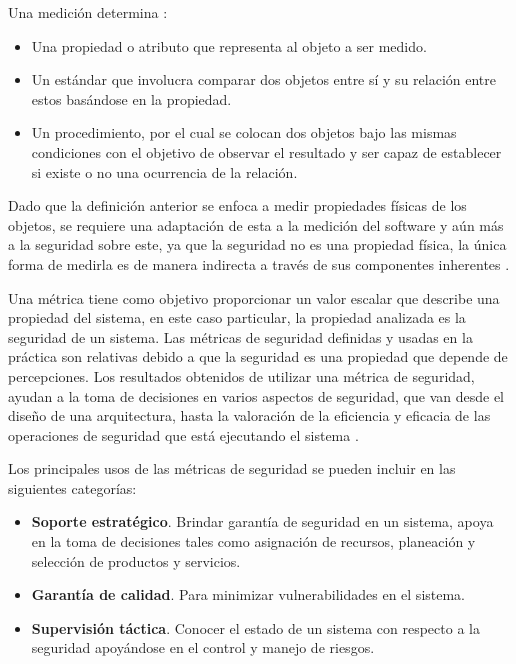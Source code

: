 Una medición determina \cite{ZalDraMcK14}:

\begin{itemize}[noitemsep]
	\item Una propiedad o atributo que representa al objeto a ser medido.
	\item Un estándar que involucra comparar dos objetos entre sí y su relación entre estos basándose en la propiedad.
	\item Un procedimiento, por el cual se colocan dos objetos bajo las mismas condiciones con el objetivo de observar el resultado y ser capaz de establecer si existe o no una ocurrencia de la relación. %
\end{itemize}

Dado que la definición anterior se enfoca a medir propiedades físicas de los objetos, se requiere una adaptación de esta a la medición del software y aún más a la seguridad sobre este, ya que la seguridad no es una propiedad física, la única forma de medirla es de manera indirecta a través de sus componentes inherentes \cite{ZalDraMcK14}.


\vspace{0.3cm}

Una métrica tiene como objetivo proporcionar un valor escalar que describe una propiedad del sistema, en este caso particular, la propiedad analizada es la seguridad de un sistema. Las métricas de seguridad definidas y usadas en la práctica son relativas debido a que la seguridad es una propiedad que depende de percepciones.  Los resultados obtenidos de utilizar una métrica de seguridad, ayudan a la toma de decisiones en varios aspectos de seguridad, que van desde el diseño de una arquitectura, hasta la valoración de la eficiencia y eficacia de las operaciones de seguridad que está ejecutando el sistema \cite{Var1103,Jan0904}. 

\vspace{0.3cm}

Los principales usos de las métricas de seguridad se pueden incluir en las siguientes categorías:

\begin{itemize}[noitemsep]
	\item \textbf{Soporte estratégico}. Brindar garantía de seguridad en un sistema, apoya en la toma de decisiones tales como asignación de recursos, planeación y selección de productos y servicios. 
	\item \textbf{Garantía de calidad}. Para minimizar vulnerabilidades en el sistema.
	\item \textbf{Supervisión táctica}. Conocer el estado de un sistema con respecto a la seguridad apoyándose en el control y manejo de riesgos. 
\end{itemize}

